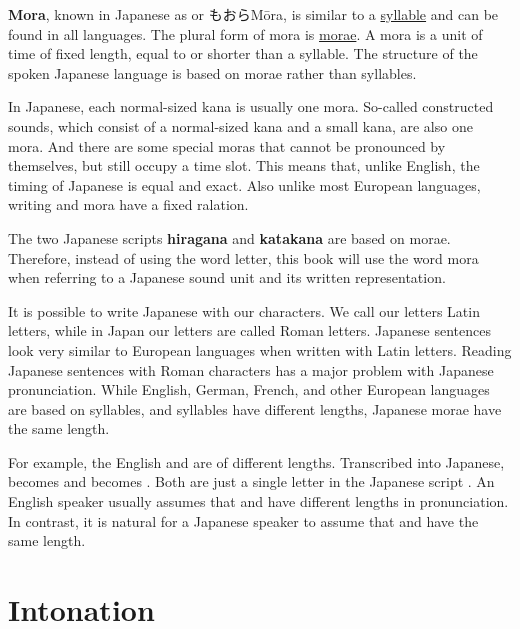 
\textbf{Mora}, known in Japanese as  or
もおら{Mōra}, is similar to a
\hyperref[sec:Syllable]{syllable} and can be found in all languages. The plural
form of mora is \hyperref[sec:Mora]{morae}. A mora is a unit of time of fixed
length, equal to or shorter than a syllable. The structure of the spoken
Japanese language is based on morae rather than syllables.

In Japanese, each normal-sized kana is usually one mora. So-called constructed
sounds, which consist of a normal-sized kana and a small kana, are also one
mora. And there are some special moras that cannot be pronounced by themselves,
but still occupy a time slot. This means that, unlike English, the timing of
Japanese is equal and exact. Also unlike most European languages, writing and
mora have a fixed ralation.

The two Japanese scripts \textbf{hiragana} and \textbf{katakana} are based on
morae. Therefore, instead of using the word letter, this book will use the
word mora when referring to a Japanese sound unit and its written
representation.

It is possible to write Japanese with our characters. We call our letters Latin
letters, while in Japan our letters are called Roman letters. Japanese
sentences look very similar to European languages when written with Latin
letters. Reading Japanese sentences with Roman characters has a major problem
with Japanese pronunciation. While English, German, French, and other European
languages are based on syllables, and syllables have different lengths,
Japanese morae have the same length.

For example, the English  and  are of different lengths.
Transcribed into Japanese,  becomes \jquotesingleja{\jkanaletteri} and
 becomes \jquotesingleja{\jkanalettershi}. Both are just a single
letter in the Japanese script \jtopic. An English speaker usually assumes that
 and  have different lengths in pronunciation. In contrast, it
is natural for a Japanese speaker to assume that \jquotesingleja{\jkanaletteri}
and \jquotesingleja{\jkanalettershi} have the same length.

\section{Intonation}

